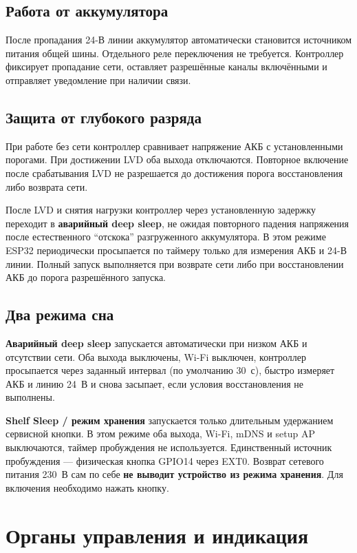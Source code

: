 \documentclass[11pt,a4paper]{article}
\begin{document}
\subsection{Работа от аккумулятора}
После пропадания 24-В линии аккумулятор автоматически становится источником питания общей шины. Отдельного реле переключения не требуется. Контроллер фиксирует пропадание сети, оставляет разрешённые каналы включёнными и отправляет уведомление при наличии связи.

\subsection{Защита от глубокого разряда}
При работе без сети контроллер сравнивает напряжение АКБ с установленными порогами. При достижении LVD оба выхода отключаются. Повторное включение после срабатывания LVD не разрешается до достижения порога восстановления либо возврата сети.

После LVD и снятия нагрузки контроллер через установленную задержку переходит в \textbf{аварийный deep sleep}, не ожидая повторного падения напряжения после естественного ``отскока'' разгруженного аккумулятора. В этом режиме ESP32 периодически просыпается по таймеру только для измерения АКБ и 24-В линии. Полный запуск выполняется при возврате сети либо при восстановлении АКБ до порога разрешённого запуска.

\subsection{Два режима сна}
\textbf{Аварийный deep sleep} запускается автоматически при низком АКБ и отсутствии сети. Оба выхода выключены, Wi-Fi выключен, контроллер просыпается через заданный интервал (по умолчанию 30~с), быстро измеряет АКБ и линию 24~В и снова засыпает, если условия восстановления не выполнены.

\textbf{Shelf Sleep / режим хранения} запускается только длительным удержанием сервисной кнопки. В этом режиме оба выхода, Wi-Fi, mDNS и setup AP выключаются, таймер пробуждения не используется. Единственный источник пробуждения --- физическая кнопка GPIO14 через EXT0. Возврат сетевого питания 230~В сам по себе \textbf{не выводит устройство из режима хранения}. Для включения необходимо нажать кнопку.

\section{Органы управления и индикация}
\end{document}
